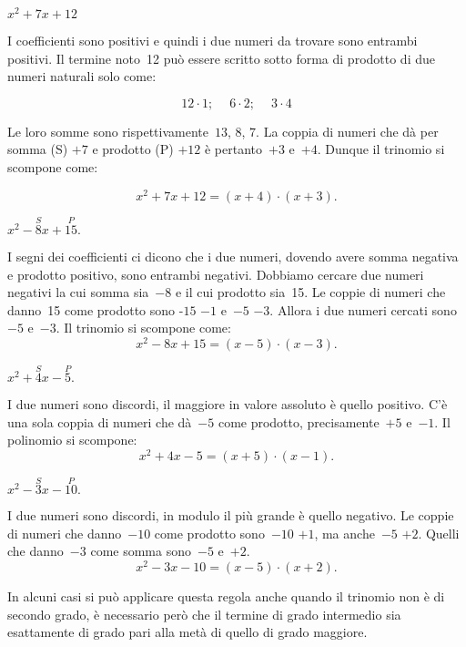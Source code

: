 \begin{exrig}
 \begin{esempio}
 $x^{2}+7x+12$

 I coefficienti sono positivi e quindi i due numeri da trovare sono
entrambi positivi.
Il termine noto~12 può essere scritto sotto forma di prodotto di due
numeri naturali solo come:

\[12\cdot 1;\quad~6\cdot 2;\quad~3\cdot 4\]

Le loro somme sono rispettivamente~$13$, $8$, $7$. La coppia di numeri che
dà per somma (S) $+7$ e prodotto (P) $+12$ è pertanto~$+3$ e~$+4$. Dunque il
trinomio si scompone come:

\[x^{2}+7x+12=\left(x+4\right)\cdot \left(x+3\right).\]
 \end{esempio}

 \begin{esempio}
 $x^{2}-\overset{S}{8}x+\overset{P}{15}.$

I segni dei coefficienti ci dicono che i due numeri, dovendo avere somma
negativa e prodotto positivo, sono entrambi negativi. Dobbiamo cercare
due numeri negativi la cui somma sia~$-8$ e il cui prodotto sia~15. Le
coppie di numeri che danno~15 come prodotto sono -$15$ $-1$ e~$-5$ $-3$.
Allora i due numeri cercati sono~$-5$ e~$-3$. Il trinomio si scompone
come:
\[x^{2}-8x+15=\left(x-5\right)\cdot \left(x-3\right).\]
 \end{esempio}

\begin{esempio}
 $x^{2}+\overset{S}{4}x-\overset{P}{5}.$

I due numeri sono discordi, il maggiore in valore assoluto è quello
positivo. C'è una sola coppia di numeri che dà~$-5$
come prodotto, precisamente~$+5$ e~$-1$. Il polinomio si scompone:
\[x^{2}+4x-5=\left(x+5\right)\cdot \left(x-1\right).\]
\end{esempio}

\begin{esempio}
 $x^{2}-\overset{S}{3}x-\overset{P}{10}.$

I due numeri sono discordi, in modulo il più grande è quello
negativo. Le coppie di numeri che danno~$-10$ come prodotto sono~$-10$ $+1$,
ma anche~$-5$ $+2$. Quelli che danno~$-3$ come somma sono~$-5$ e~$+2$.
\[x^{2}-3x-10=\left(x-5\right)\cdot \left(x+2\right).\]
\end{esempio}

\begin{esempio}
 In alcuni casi si può applicare questa regola anche quando il trinomio
non è di secondo grado, è necessario però che il termine di grado
intermedio sia esattamente di grado pari alla metà di quello di grado
maggiore.


\end{esempio}
\end{exrig}
